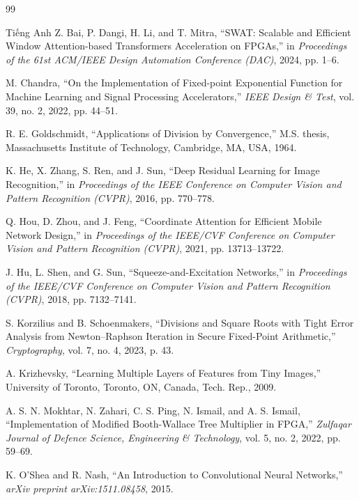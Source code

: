 \documentclass{uetgraduation}
\begin{document}
\begin{thebibliography}{99}
\begin{bibsection}{Tiếng Anh}
Z. Bai, P. Dangi, H. Li, and T. Mitra, ``SWAT: Scalable and Efficient Window Attention-based Transformers Acceleration on FPGAs,'' in \textit{Proceedings of the 61st ACM/IEEE Design Automation Conference (DAC)}, 2024, pp. 1--6.

M. Chandra, ``On the Implementation of Fixed-point Exponential Function for Machine Learning and Signal Processing Accelerators,'' \textit{IEEE Design \& Test}, vol. 39, no. 2, 2022, pp. 44--51.

R. E. Goldschmidt, ``Applications of Division by Convergence,'' M.S. thesis, Massachusetts Institute of Technology, Cambridge, MA, USA, 1964.

K. He, X. Zhang, S. Ren, and J. Sun, ``Deep Residual Learning for Image Recognition,'' in \textit{Proceedings of the IEEE Conference on Computer Vision and Pattern Recognition (CVPR)}, 2016, pp. 770--778.

Q. Hou, D. Zhou, and J. Feng, ``Coordinate Attention for Efficient Mobile Network Design,'' in \textit{Proceedings of the IEEE/CVF Conference on Computer Vision and Pattern Recognition (CVPR)}, 2021, pp. 13713--13722.

J. Hu, L. Shen, and G. Sun, ``Squeeze-and-Excitation Networks,'' in \textit{Proceedings of the IEEE/CVF Conference on Computer Vision and Pattern Recognition (CVPR)}, 2018, pp. 7132--7141.

S. Korzilius and B. Schoenmakers, ``Divisions and Square Roots with Tight Error Analysis from Newton–Raphson Iteration in Secure Fixed-Point Arithmetic,'' \textit{Cryptography}, vol. 7, no. 4, 2023, p. 43.

A. Krizhevsky, ``Learning Multiple Layers of Features from Tiny Images,'' University of Toronto, Toronto, ON, Canada, Tech. Rep., 2009.

A. S. N. Mokhtar, N. Zahari, C. S. Ping, N. Ismail, and A. S. Ismail, ``Implementation of Modified Booth-Wallace Tree Multiplier in FPGA,'' \textit{Zulfaqar Journal of Defence Science, Engineering \& Technology}, vol. 5, no. 2, 2022, pp. 59--69.

K. O'Shea and R. Nash, ``An Introduction to Convolutional Neural Networks,'' \textit{arXiv preprint arXiv:1511.08458}, 2015.


\end{bibsection}
\end{thebibliography}
\end{document}
